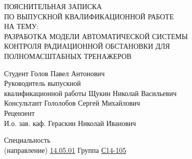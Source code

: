 \begin{center}
	\large
	\hfill \break \hfill \break \hfill \break \hfill \break
	ПОЯСНИТЕЛЬНАЯ ЗАПИСКА\\ ПО ВЫПУСКНОЙ КВАЛИФИКАЦИОННОЙ РАБОТЕ\\ НА ТЕМУ:\\[1.5cm]

	\normalsize
	РАЗРАБОТКА МОДЕЛИ АВТОМАТИЧЕСКОЙ СИСТЕМЫ \\ КОНТРОЛЯ РАДИАЦИОННОЙ ОБСТАНОВКИ ДЛЯ \\ПОЛНОМАСШТАБНЫХ ТРЕНАЖЕРОВ\\[6.0cm]
\end{center}

\noindent
\small
Студент \hspace{4.2cm} \underline{\hspace{4.2cm}} \hspace{0.7cm} Голов Павел Антонович\\

\noindent
Руководитель выпускной\\ квалификационной работы \hspace{0.85cm} \underline{\hspace{4.2cm}} \hspace{0.7cm} Щукин Николай Васильевич\\

\noindent
Консультант \hspace{3.35cm} \underline{\hspace{4.2cm}} \hspace{0.7cm} Гололобов Сергей Михайлович\\

\noindent
Рецензент \hspace{3.85cm} \underline{\hspace{4.2cm}} \hspace{0.7cm} \\

\noindent
И.о. зав. каф. \hspace{3.25cm} \underline{\hspace{4.2cm}} \hspace{0.7cm} Гераскин Николай Иванович\\[0.6cm]

\clearpage

\normalsize
\noindent
Специальность\\ (направление) \underline{14.05.01} \hspace{4.0cm} Группа \underline{С14-105}


